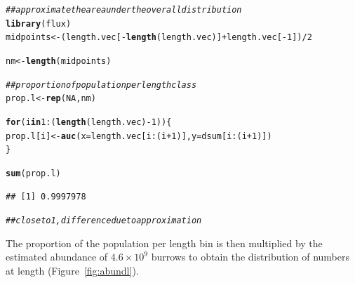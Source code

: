 \documentclass[12pt]{article}\usepackage[]{graphicx}\usepackage[]{color}
\makeatletter
\newcommand{\hlnum}[1]{\textcolor[rgb]{0.686,0.059,0.569}{#1}}%
\newcommand{\hlcom}[1]{\textcolor[rgb]{0.678,0.584,0.686}{\textit{#1}}}%
\newcommand{\hlopt}[1]{\textcolor[rgb]{0,0,0}{#1}}%
\newcommand{\hlstd}[1]{\textcolor[rgb]{0.345,0.345,0.345}{#1}}%
\newcommand{\hlkwa}[1]{\textcolor[rgb]{0.161,0.373,0.58}{\textbf{#1}}}%
\newcommand{\hlkwb}[1]{\textcolor[rgb]{0.69,0.353,0.396}{#1}}%
\newcommand{\hlkwc}[1]{\textcolor[rgb]{0.333,0.667,0.333}{#1}}%
\newcommand{\hlkwd}[1]{\textcolor[rgb]{0.737,0.353,0.396}{\textbf{#1}}}%
\newenvironment{kframe}{%
 \def\at@end@of@kframe{}%
 \ifinner\ifhmode%
  \def\at@end@of@kframe{\end{minipage}}%
  \begin{minipage}{\columnwidth}%
 \fi\fi%
 \def\FrameCommand##1{\hskip\@totalleftmargin \hskip-\fboxsep
 \colorbox{shadecolor}{##1}\hskip-\fboxsep
     \hskip-\linewidth \hskip-\@totalleftmargin \hskip\columnwidth}%
 \MakeFramed {\advance\hsize-\width
   \@totalleftmargin\z@ \linewidth\hsize
   \@setminipage}}%
 {\par\unskip\endMakeFramed%
 \at@end@of@kframe}
\newenvironment{knitrout}{}{} %
\makeatother
\begin{document}
\begin{knitrout}\footnotesize
{}\color{fgcolor}\begin{kframe}
\begin{alltt}
\hlcom{## approximate the area under the overall distribution}
\hlkwd{library}\hlstd{(flux)}
\hlstd{midpoints} \hlkwb{<-} \hlstd{(length.vec[}\hlopt{-}\hlkwd{length}\hlstd{(length.vec)]} \hlopt{+} \hlstd{length.vec[}\hlopt{-}\hlnum{1}\hlstd{])}\hlopt{/}\hlnum{2}

\hlstd{nm} \hlkwb{<-} \hlkwd{length}\hlstd{(midpoints)}

\hlcom{## proportion of population per length class}
\hlstd{prop.l} \hlkwb{<-} \hlkwd{rep}\hlstd{(}\hlnum{NA}\hlstd{, nm)}

\hlkwa{for}\hlstd{(i} \hlkwa{in} \hlnum{1}\hlopt{:}\hlstd{(}\hlkwd{length}\hlstd{(length.vec)} \hlopt{-} \hlnum{1}\hlstd{))\{}
  \hlstd{prop.l[i]} \hlkwb{<-} \hlkwd{auc}\hlstd{(}\hlkwc{x} \hlstd{= length.vec[i}\hlopt{:}\hlstd{(i} \hlopt{+} \hlnum{1}\hlstd{)],} \hlkwc{y} \hlstd{= dsum[i}\hlopt{:}\hlstd{(i} \hlopt{+} \hlnum{1}\hlstd{)])}
\hlstd{\}}

\hlkwd{sum}\hlstd{(prop.l)}
\end{alltt}
\begin{verbatim}
## [1] 0.9997978
\end{verbatim}
\begin{alltt}
\hlcom{## close to 1, difference due to approximation}
\end{alltt}
\end{kframe}
\end{knitrout}

The proportion of the population per length bin is then multiplied by the estimated abundance of $4.6 \times 10^9$ burrows \citep{Ligas:etal:survey:2014} to obtain the distribution of numbers at length (Figure~\ref{fig:abundl}).
\end{document}
